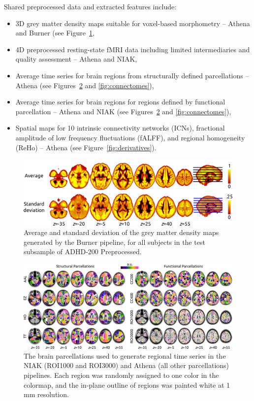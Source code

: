 \documentclass[preprint,12pt,3p]{elsarticle}
\providecommand{\tightlist}{%
  \setlength{\itemsep}{0pt}\setlength{\parskip}{0pt}}
\begin{document}
Shared preprocessed data and extracted features include:
\begin{itemize}
\tightlist
    \item 3D grey matter density maps suitable for voxel-based morphometry -- Athena and Burner (see Figure~\ref{fig:burner},
    \item 4D preprocessed resting-state fMRI data including limited intermediaries and quality assessment -- Athena and NIAK,
    \item Average time series for brain regions from structurally defined parcellations -- Athena (see Figures~\ref{fig:parcels} and \ref{fig:connectomes}),
    \item Average time series for brain regions for regions defined by functional parcellation -- Athena and NIAK (see Figures~\ref{fig:parcels} and \ref{fig:connectomes}),
    \item Spatial maps for 10 intrinsic connectivity networks (ICNs), fractional amplitude of low frequency fluctuations (fALFF), and regional homogeneity (ReHo) -- Athena (see Figure~\ref{fig:derivatives}).
\end{itemize}

\begin{figure}[!t]
\begin{center}
  \includegraphics[width=0.6\linewidth]{fig_burner}
  \caption{Average and standard deviation of the grey matter density maps generated by the Burner pipeline, for all subjects in the test subsample of ADHD-200 Preprocessed. }
  \label{fig:burner}
\end{center}
\end{figure}

\begin{figure}[!t]
\begin{center}
  \includegraphics[width=\linewidth]{fig_parcels}
  \caption{The brain parcellations used to generate regional time series in the NIAK (ROI1000 and ROI3000) and Athena (all other parcellations) pipelines. Each region was randomly assigned to one color in the colormap, and the in-plane outline of regions was painted white at 1 mm resolution.}
  \label{fig:parcels}
\end{center}
\end{figure}
\end{document}
